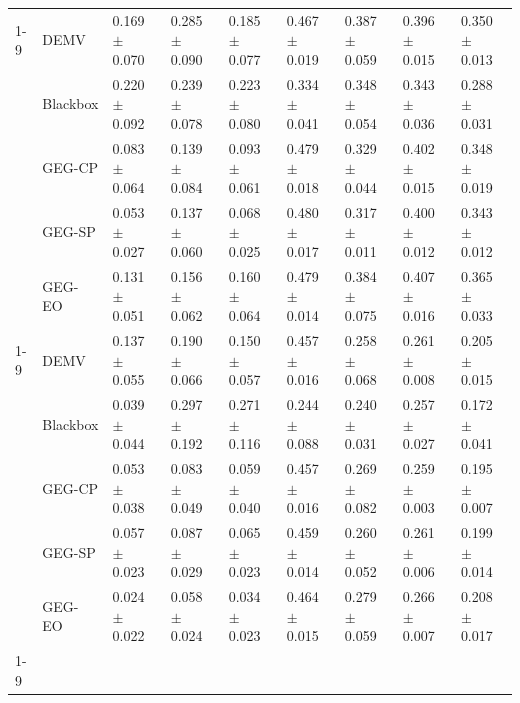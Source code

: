 \begin{table}
\begin{tabular}{lllllllll}
\cline{1-9}
\multirow[t]{5}{*}{park} & DEMV & 0.169 $\pm$ 0.070 & 0.285 $\pm$ 0.090 & 0.185 $\pm$ 0.077 & 0.467 $\pm$ 0.019 & 0.387 $\pm$ 0.059 & 0.396 $\pm$ 0.015 & 0.350 $\pm$ 0.013 \\
 & Blackbox & 0.220 $\pm$ 0.092 & 0.239 $\pm$ 0.078 & 0.223 $\pm$ 0.080 & 0.334 $\pm$ 0.041 & 0.348 $\pm$ 0.054 & 0.343 $\pm$ 0.036 & 0.288 $\pm$ 0.031 \\
 & GEG-CP & 0.083 $\pm$ 0.064 & 0.139 $\pm$ 0.084 & 0.093 $\pm$ 0.061 & 0.479 $\pm$ 0.018 & 0.329 $\pm$ 0.044 & 0.402 $\pm$ 0.015 & 0.348 $\pm$ 0.019 \\
 & GEG-SP & 0.053 $\pm$ 0.027 & 0.137 $\pm$ 0.060 & 0.068 $\pm$ 0.025 & 0.480 $\pm$ 0.017 & 0.317 $\pm$ 0.011 & 0.400 $\pm$ 0.012 & 0.343 $\pm$ 0.012 \\
 & GEG-EO & 0.131 $\pm$ 0.051 & 0.156 $\pm$ 0.062 & 0.160 $\pm$ 0.064 & 0.479 $\pm$ 0.014 & 0.384 $\pm$ 0.075 & 0.407 $\pm$ 0.016 & 0.365 $\pm$ 0.033 \\
\cline{1-9}
\multirow[t]{5}{*}{wine} & DEMV & 0.137 $\pm$ 0.055 & 0.190 $\pm$ 0.066 & 0.150 $\pm$ 0.057 & 0.457 $\pm$ 0.016 & 0.258 $\pm$ 0.068 & 0.261 $\pm$ 0.008 & 0.205 $\pm$ 0.015 \\
 & Blackbox & 0.039 $\pm$ 0.044 & 0.297 $\pm$ 0.192 & 0.271 $\pm$ 0.116 & 0.244 $\pm$ 0.088 & 0.240 $\pm$ 0.031 & 0.257 $\pm$ 0.027 & 0.172 $\pm$ 0.041 \\
 & GEG-CP & 0.053 $\pm$ 0.038 & 0.083 $\pm$ 0.049 & 0.059 $\pm$ 0.040 & 0.457 $\pm$ 0.016 & 0.269 $\pm$ 0.082 & 0.259 $\pm$ 0.003 & 0.195 $\pm$ 0.007 \\
 & GEG-SP & 0.057 $\pm$ 0.023 & 0.087 $\pm$ 0.029 & 0.065 $\pm$ 0.023 & 0.459 $\pm$ 0.014 & 0.260 $\pm$ 0.052 & 0.261 $\pm$ 0.006 & 0.199 $\pm$ 0.014 \\
 & GEG-EO & 0.024 $\pm$ 0.022 & 0.058 $\pm$ 0.024 & 0.034 $\pm$ 0.023 & 0.464 $\pm$ 0.015 & 0.279 $\pm$ 0.059 & 0.266 $\pm$ 0.007 & 0.208 $\pm$ 0.017 \\
\cline{1-9}
\bottomrule
\end{tabular}
\end{table}
